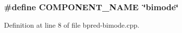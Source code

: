 \subsubsection[{COMPONENT\_\-NAME}]{\setlength{\rightskip}{0pt plus 5cm}\#define COMPONENT\_\-NAME~\char`\"{}bimode\char`\"{}}\label{bpred-bimode_8cpp_9146ade7ce24e3db226a973a59063892}




Definition at line 8 of file bpred-bimode.cpp.